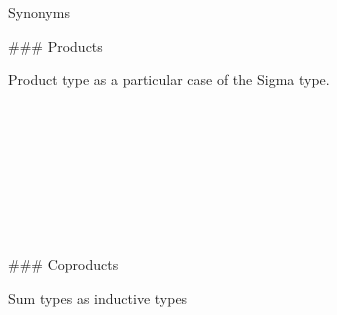 Synonyms
\begin{code}%
\>[0]\AgdaSpace{}%
\AgdaSymbol{=}\AgdaSpace{}%
%
\>[8]\<%
\end{code}

### Products

Product type as a particular case of the Sigma type.

\begin{code}%
\>[0]\<%
\\
\>[0][@{}l@{\AgdaIndent{0}}]%
\>[2]\AgdaSymbol{:}\AgdaSpace{}%
\AgdaSymbol{(}\AgdaSpace{}%
\AgdaSymbol{:}\AgdaSpace{}%
\AgdaSpace{}%
\AgdaSymbol{)}\AgdaSpace{}%
\AgdaSymbol{(}\AgdaSpace{}%
\AgdaSymbol{:}\AgdaSpace{}%
\AgdaSpace{}%
\AgdaSymbol{)}\<%
\\
%
\>[2]\AgdaComment{----------------------------}\<%
\\
%
\>[2]\AgdaSpace{}%
\AgdaSpace{}%
\AgdaSymbol{(}\AgdaSpace{}%
\AgdaSpace{}%
\AgdaSymbol{)}\<%
\\
%
\\[\AgdaEmptyExtraSkip]%
\>[0]\AgdaSpace{}%
\AgdaSpace{}%
\AgdaSpace{}%
\AgdaSymbol{=}\AgdaSpace{}%
\AgdaSpace{}%
\AgdaSpace{}%
\AgdaSpace{}%
\AgdaBound{\AgdaUnderscore{}}\AgdaSpace{}%
\AgdaSpace{}%
\AgdaSymbol{)}\<%
\\
%
\\[\AgdaEmptyExtraSkip]%
\>[0]%
\>[8]\AgdaSpace{}%
\<%
\end{code}

### Coproducts

Sum types as inductive types

